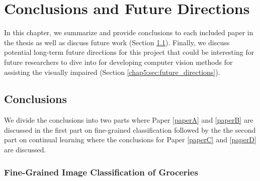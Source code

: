
\chapter{Conclusions and Future Directions}\label{chap5}

In this chapter, we summarize and provide conclusions to each included paper in the thesis as well as discuss future work (Section \ref{chap5:sec:conclusions}). Finally, we discuss potential long-term future directions for this project that could be interesting for future researchers to dive into for developing computer vision methods for assisting the visually impaired (Section \ref{chap5:sec:future_directions}).

\section{Conclusions}\label{chap5:sec:conclusions}

We divide the conclusions into two parts where Paper \ref{paperA} and \ref{paperB} are discussed in the first part on fine-grained classification followed by the the second part on continual learning where the conclusions for Paper \ref{paperC} and \ref{paperD} are discussed.

\subsection{Fine-Grained Image Classification of Groceries}


